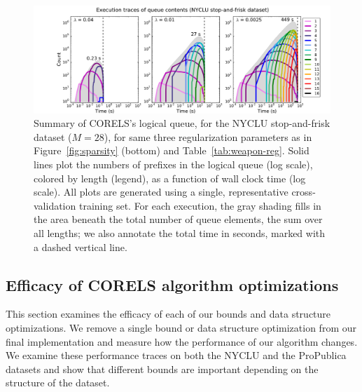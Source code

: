 \begin{figure}[t!]
\begin{center}
\includegraphics[trim={30mm 0mm 15mm 5mm},
width=\textwidth]{figs/weapon_reg-queue.pdf}
\end{center}
\vspace{-5mm}
\caption{Summary of CORELS's logical queue,
for the NYCLU stop-and-frisk dataset (${M = 28}$),
for same three regularization parameters as in Figure~\ref{fig:sparsity} (bottom)
and Table~\ref{tab:weapon-reg}.
%
Solid lines plot the numbers of prefixes in the logical queue (log scale), colored by length (legend),
as a function of wall clock time (log scale).
%
All plots are generated using a single, representative cross-validation training set.
%
For each execution, the gray shading fills in the area beneath the total number
of queue elements, \ie the sum over all lengths;
we also annotate the total time in seconds, marked with a dashed vertical line.
}
\label{fig:queue-weapon-reg}
\end{figure}

\subsection{Efficacy of CORELS algorithm optimizations}
\label{sec:ablation}

This section examines the efficacy of each of our bounds and data structure optimizations.
%
We remove a single bound or data structure optimization from our final implementation and measure
how the performance of our algorithm changes.
%
We examine these performance traces on both the NYCLU and the ProPublica datasets and show that
different bounds are important depending on the structure of the dataset.

